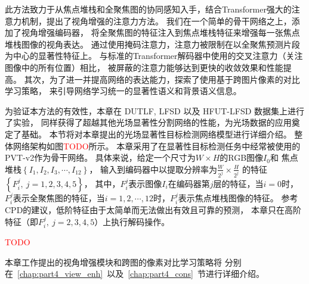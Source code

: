 此方法致力于从焦点堆栈和全聚焦图的协同感知入手，结合Transformer强大的注意力机制，提出了视角增强的注意力方法。
我们在一个简单的骨干网络之上，添加了视角增强编码器，
将全聚焦图的特征注入到焦点堆栈特征来增强每一张焦点堆栈图像的视角表达。
通过使用掩码注意力，注意力被限制在以全聚焦预测片段为中心的显著性特征上。
与标准的Transformer解码器中使用的交叉注意力（关注图像中的所有位置）相比，
被屏蔽的注意力能够达到更快的收敛效果和性能提高。
其次，为了进一并提高网络的表达能力，探索了使用基于跨图片像素的对比学习策略，
来引导网络学习统一的显著性语义和背景语义信息。
\par
% 
% 
% 
% 
为验证本方法的有效性，本章在 DUTLF, LFSD 以及 HFUT-LFSD 数据集上进行了实验，
同样获得了超越其他光场显著性分割网络的性能，为光场数据的应用奠定了基础。
% 
% 
% 
% 
% 
% 
% 
% 
% 
% 
本节将对本章提出的光场显著性目标检测网络模型进行详细介绍。
整体网络架构如图\textcolor{red}{TODO}所示。
本章采用了在显著性目标检测任务中经常被使用的PVT-v2作为骨干网络。
具体来说，给定一个尺寸为$W \times H$的RGB图像$I_{0}$和
焦点堆栈$\left \{  I_{1},I_{2},I_{3},\cdots,I_{12} \right \} $，
输入到编码器中以提取分辨率为$\frac{W}{2^{j}} \times \frac{H}{2^{j}} $
的特征$\left \{ F_{i}^{j},~j=1,2,3,4,5 \right \}$，
其中，$F_{i}^{j}$表示图像$I_{i}$在编码器第$j$层的特征，当$i=0$时，
$F_{i}^{j}$表示全聚焦图的特征，当$i=1,2,\cdots,12$时，$F_{i}^{j}$表示焦点堆栈图像的特征。
参考CPD的建议，低阶特征由于太简单而无法做出有效且可靠的预测，
本章只在高阶特征（即$F_{i}^{j},~j=2,3,4,5$）上执行解码操作。

\textcolor{red}{TODO}

本章工作提出的视角增强模块和跨图的像素对比学习策略将
分别在~\ref{chap:part4_view_enh}~以及~\ref{chap:part4_cons}~节进行详细介绍。


